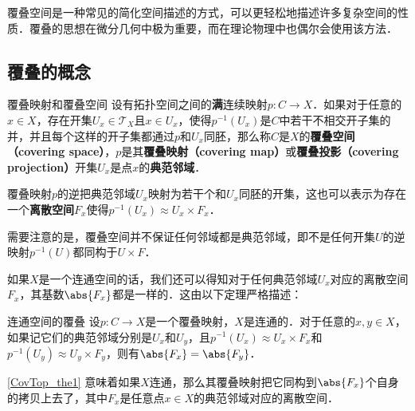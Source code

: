 

覆叠空间是一种常见的简化空间描述的方式，可以更轻松地描述许多复杂空间的性质．覆叠的思想在微分几何中极为重要，而在理论物理中也偶尔会使用该方法．

\subsection{覆叠的概念}
\begin{definition}{覆叠映射和覆叠空间}\label{CovTop_def1}
设有拓扑空间之间的\textbf{满}连续映射$p:C\rightarrow X$．如果对于任意的$x\in X$，存在开集$U_x\in\mathcal{T}_X$且$x\in U_x$，使得$p^{-1}(U_x)$是$C$中若干不相交开子集的并，并且每个这样的开子集都通过$p$和$U_x$同胚，那么称$C$是$X$的\textbf{覆叠空间（covering space）}，$p$是其\textbf{覆叠映射（covering map）}或\textbf{覆叠投影（covering projection）}开集$U_x$是点$x$的\textbf{典范邻域}．
\end{definition} 

覆叠映射$p$的逆把典范邻域$U_x$映射为若干个和$U_x$同胚的开集，这也可以表示为存在一个\textbf{离散空间}$F_x$使得$p^{-1}(U_x)\approx U_x\times F_x$．

需要注意的是，覆叠空间并不保证任何邻域都是典范邻域，即不是任何开集$U$的逆映射$p^{-1}(U)$都同构于$U\times F$．

如果$X$是一个连通空间的话，我们还可以得知对于任何典范邻域$U_x$对应的离散空间$F_x$，其基数$\abs{F_x}$都是一样的．这由以下定理严格描述：

\begin{theorem}{连通空间的覆叠}\label{CovTop_the1}
设$p:C\rightarrow X$是一个覆叠映射，$X$是连通的．对于任意的$x, y\in X$，如果记它们的典范邻域分别是$U_x$和$U_y$，且$p^{-1}(U_x)\approx U_x\times F_x$和$p^{-1}(U_y)\approx U_y\times F_y$，则有$\abs{F_x}=\abs{F_y}$．
\end{theorem}

\autoref{CovTop_the1} 意味着如果$X$连通，那么其覆叠映射把它同构到$\abs{F_x}$个自身的拷贝上去了，其中$F_x$是任意点$x\in X$的典范邻域对应的离散空间．





